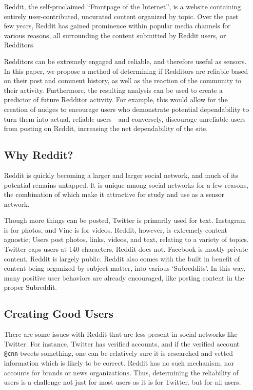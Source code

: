 Reddit, the self-proclaimed ``Frontpage of the Internet'', is a website
containing entirely user-contributed, uncurated content organized by topic. Over
the past few years, Reddit has gained prominence within popular media channels
for various reasons, all surrounding the content submitted by Reddit users, or
Redditors.

Redditors can be extremely engaged and reliable, and therefore useful as
sensors. In this paper, we propose a method of determining if Redditors are
reliable based on their post and comment history, as well as the reaction of the
community to their activity. Furthermore, the resulting analysis can be used to
create a predictor of future Redditor activity. For example, this would allow
for the creation of nudges to encourage users who demonstrate potential
dependability to turn them into actual, reliable users - and conversely,
discourage unreliable users from posting on Reddit, increasing the net
dependability of the site.

\subsection{Why Reddit?}
\label{sub:why_reddit}

Reddit is quickly becoming a larger and larger social network, and much of its
potential remains untapped. It is unique among social networks for a few
reasons, the combination of which make it attractive for study and use as a
sensor network.

Though more things can be posted, Twitter is primarily used for text. Instagram
is for photos, and Vine is for videos. Reddit, however, is extremely content
agnostic; Users post photos, links, videos, and text, relating to a variety of
topics. Twitter caps users at 140 characters, Reddit does not. Facebook is
mostly private content, Reddit is largely public. Reddit also comes with the
built in benefit of content being organized by subject matter, into various
`Subreddits'. In this way, many positive user behaviors are already encouraged,
like posting content in the proper Subreddit.


\subsection{Creating Good Users}
\label{sub:creating_good_users}

There are some issues with Reddit that are less present in social networks like
Twitter. For instance, Twitter has verified accounts, and if the verified
account \texttt{@cnn} tweets something, one can be relatively sure it is
researched and vetted information which is likely to be correct. Reddit has no
such mechanism, nor accounts for brands or news organizations. Thus, determining
the reliability of users is a challenge not just for most users as it is for
Twitter, but for all users.

